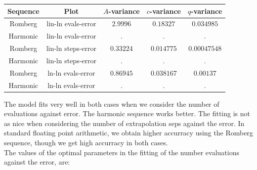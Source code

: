 \begin{table}[H]
    \centering
    \begin{tabular}{c|c||c|c|c}
Sequence & Plot & \(A\)-variance & \(c\)-variance & \(q\)-variance\\\hline
Romberg & lin-ln evals-error & \(2.9996\) & \(0.18327\) & \(0.034985\) \\
Harmonic & lin-ln evals-error & . & . & . \\
Romberg & lin-ln steps-error & \(0.33224\) & \(0.014775\) & \(0.00047548\) \\
Harmonic & lin-ln steps-error & . & . & . \\
Romberg & ln-ln evals-error & \(0.86945\) & \(0.038167\) & \(0.00137\) \\
Harmonic & ln-ln evals-error & . & . & . \\
    \end{tabular}
    \label{tab:my_label}
\end{table}

The model fits very well in both cases when we consider the number of evaluations against error. The harmonic sequence works better. The fitting is not as nice when considering the number of extrapolation seps against the error. In standard floating point arithmetic, we obtain higher accurracy using the Romberg sequence, though we get high accurracy in both cases.\\

The values of the optimal parameters in the fitting of the number evaluations against the error, are:

